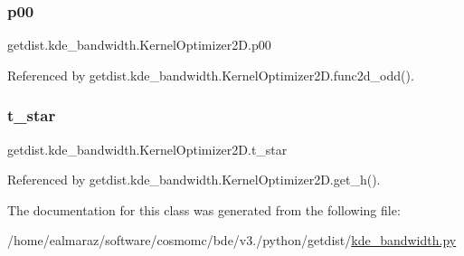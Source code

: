 \subsubsection{\texorpdfstring{p00}{p00}}
{\footnotesize\ttfamily getdist.\+kde\+\_\+bandwidth.\+Kernel\+Optimizer2\+D.\+p00}



Referenced by getdist.\+kde\+\_\+bandwidth.\+Kernel\+Optimizer2\+D.\+func2d\+\_\+odd().

\mbox{\label{classgetdist_1_1kde__bandwidth_1_1KernelOptimizer2D_ac89a32b2219020c91169fa768b878e22}} 
\subsubsection{\texorpdfstring{t\+\_\+star}{t\_star}}
{\footnotesize\ttfamily getdist.\+kde\+\_\+bandwidth.\+Kernel\+Optimizer2\+D.\+t\+\_\+star}



Referenced by getdist.\+kde\+\_\+bandwidth.\+Kernel\+Optimizer2\+D.\+get\+\_\+h().



The documentation for this class was generated from the following file\+:\begin{DoxyCompactItemize}
\item 
/home/ealmaraz/software/cosmomc/bde/v3./python/getdist/\mbox{\hyperlink{kde__bandwidth_8py}{kde\+\_\+bandwidth.\+py}}\end{DoxyCompactItemize}
